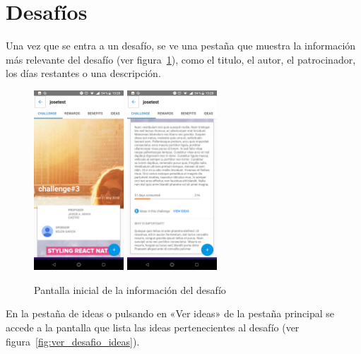 \section{Desafíos}

Una vez que se entra a un desafío, se ve una pestaña que muestra la información más 
relevante del desafío (ver figura~\ref{fig:ver_desafio_inicio}), como el titulo, el autor, el 
patrocinador, los días restantes o una descripción. 

\begin{figure}[!h]
	\begin{center}
		\includegraphics[width=0.3\textwidth]{./img/anexo1/ver_desafio_inicio.png}
		\includegraphics[width=0.3\textwidth]{./img/anexo1/ver_desafio_inicio_cont.png}
		\caption{Pantalla inicial de la información del desafío}
		\label{fig:ver_desafio_inicio}
	\end{center}
\end{figure}

En la pestaña de ideas o pulsando en «Ver ideas» de la pestaña principal se accede a la 
pantalla que lista las ideas pertenecientes al desafío (ver figura~\ref{fig:ver_desafio_ideas}).

